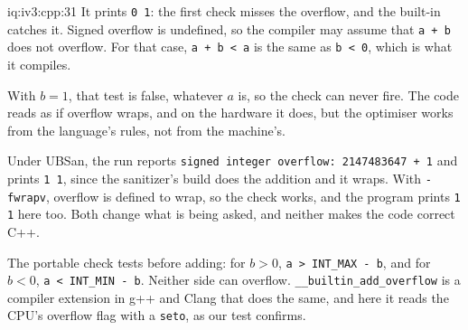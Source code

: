 \begin{solution}{iq:iv3:cpp:31}
It prints \texttt{0 1}: the first check misses the overflow, and the built-in catches it. Signed overflow is undefined, so the compiler may assume that \texttt{a + b} does not overflow. For that case, \texttt{a + b < a} is the same as \texttt{b < 0}, which is what it compiles.

With $b = 1$, that test is false, whatever $a$ is, so the check can never fire. The code reads as if overflow wraps, and on the hardware it does, but the optimiser works from the language's rules, not from the machine's.

Under UBSan, the run reports \texttt{signed integer overflow: 2147483647 + 1} and prints \texttt{1 1}, since the sanitizer's build does the addition and it wraps. With \texttt{-fwrapv}, overflow is defined to wrap, so the check works, and the program prints \texttt{1 1} here too. Both change what is being asked, and neither makes the code correct C++.

The portable check tests before adding: for $b > 0$, \texttt{a > INT\_MAX - b}, and for $b < 0$, \texttt{a < INT\_MIN - b}. Neither side can overflow. \texttt{\_\_builtin\_add\_overflow} is a compiler extension in g++ and Clang that does the same, and here it reads the CPU's overflow flag with a \texttt{seto}, as our test confirms.

\end{solution}

